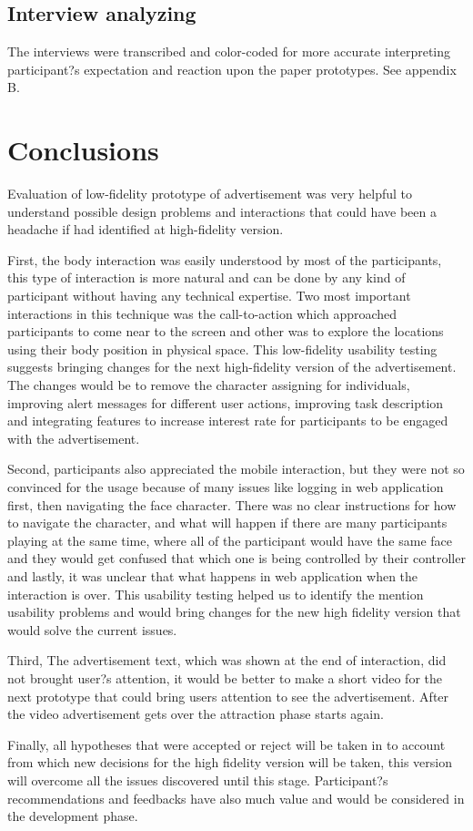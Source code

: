 \subsection {Interview analyzing}
The interviews were transcribed and color-coded for more accurate interpreting participant?s expectation and reaction upon the paper prototypes. 
See appendix B. 

\section{Conclusions}

Evaluation of low-fidelity prototype of advertisement was very helpful to understand possible design problems and interactions that could have been a headache if had identified at high-fidelity version. 

First, the body interaction was easily understood by most of the participants, this type of interaction is more natural and can be done by any kind of participant without having any technical expertise. Two most important interactions in this technique was the call-to-action which approached participants to come near to the screen and other was to explore the locations using their body position in physical space. This low-fidelity usability testing suggests bringing changes for the next high-fidelity version of the advertisement. The changes would be to remove the character assigning for individuals, improving alert messages for different user actions, improving task description and integrating features to increase interest rate for participants to be engaged with the advertisement.

Second, participants also appreciated the mobile interaction, but they were not so convinced for the usage because of many issues like logging in web application first, then navigating the face character. There was no clear instructions for how to navigate the character, and what will happen if there are many participants playing at the same time, where all of the participant would have the same face and they would get confused that which one is being controlled by their controller and lastly, it was unclear that what happens in web application when the interaction is over. This usability testing helped us to identify the mention usability problems and would bring changes for the new high fidelity version that would solve the current issues.

Third, The advertisement text, which was shown at the end of interaction, did not brought user?s attention, it would be better to make a short video for the next prototype that could bring users attention to see the advertisement. After the video advertisement gets over the attraction phase starts again.

Finally, all hypotheses that were accepted or reject will be taken in to account from which new decisions for the high fidelity version will be taken, this version will overcome all the issues discovered until this stage. Participant?s recommendations and feedbacks have also much value and would be considered in the development phase.








